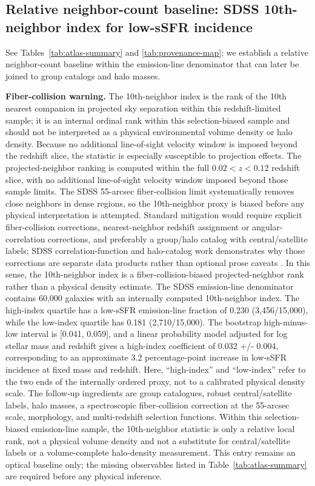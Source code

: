 \documentclass[twocolumn]{aastex631}
\begin{document}
\subsection{Relative neighbor-count baseline: SDSS 10th-neighbor index for low-sSFR incidence}
See Tables~\ref{tab:atlas-summary} and \ref{tab:provenance-map}; we establish a relative neighbor-count baseline within the emission-line denominator that can later be joined to group catalogs and halo masses. \par\noindent\textbf{Fiber-collision warning.} The 10th-neighbor index is the rank of the 10th nearest companion in projected sky separation within this redshift-limited sample; it is an internal ordinal rank within this selection-biased sample and should not be interpreted as a physical environmental volume density or halo density. Because no additional line-of-sight velocity window is imposed beyond the redshift slice, the statistic is especially susceptible to projection effects. The projected-neighbor ranking is computed within the full $0.02<z<0.12$ redshift slice, with no additional line-of-sight velocity window imposed beyond those sample limits. The SDSS 55-arcsec fiber-collision limit systematically removes close neighbors in dense regions, so the 10th-neighbor proxy is biased before any physical interpretation is attempted. Standard mitigation would require explicit fiber-collision corrections, nearest-neighbor redshift assignment or angular-correlation corrections, and preferably a group/halo catalog with central/satellite labels; SDSS correlation-function and halo-catalog work demonstrates why those corrections are separate data products rather than optional prose caveats \citep{zehavi2002,blanton2003,guo2012,yang2007}. In this sense, the 10th-neighbor index is a fiber-collision-biased projected-neighbor rank rather than a physical density estimate. The SDSS emission-line denominator contains 60,000 galaxies with an internally computed 10th-neighbor index. The high-index quartile has a low-sSFR emission-line fraction of 0.230 (3,456/15,000), while the low-index quartile has 0.181 (2,710/15,000). The bootstrap high-minus-low interval is [0.041, 0.059], and a linear probability model adjusted for log stellar mass and redshift gives a high-index coefficient of 0.032 +/- 0.004, corresponding to an approximate 3.2 percentage-point increase in low-sSFR incidence at fixed mass and redshift. Here, ``high-index'' and ``low-index'' refer to the two ends of the internally ordered proxy, not to a calibrated physical density scale. The follow-up ingredients are group catalogues, robust central/satellite labels, halo masses, a spectroscopic fiber-collision correction at the 55-arcsec scale, morphology, and multi-redshift selection functions. Within this selection-biased emission-line sample, the 10th-neighbor statistic is only a relative local rank, not a physical volume density and not a substitute for central/satellite labels or a volume-complete halo-density measurement. This entry remains an optical baseline only; the missing observables listed in Table~\ref{tab:atlas-summary} are required before any physical inference.
\end{document}
